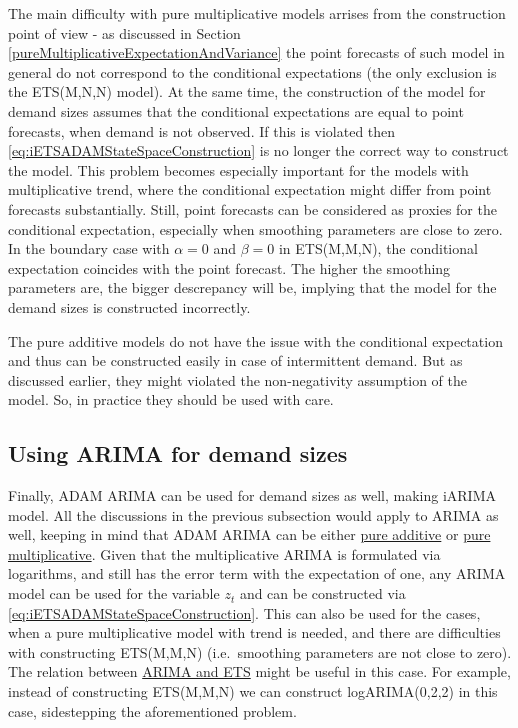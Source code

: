 \documentclass[
]{book}
\theoremstyle{definition}
\theoremstyle{definition}
\theoremstyle{definition}
\theoremstyle{definition}
\theoremstyle{remark}
\begin{document}
The main difficulty with pure multiplicative models arrises from the construction point of view - as discussed in Section \ref{pureMultiplicativeExpectationAndVariance} the point forecasts of such model in general do not correspond to the conditional expectations (the only exclusion is the ETS(M,N,N) model). At the same time, the construction of the model for demand sizes assumes that the conditional expectations are equal to point forecasts, when demand is not observed. If this is violated then \eqref{eq:iETSADAMStateSpaceConstruction} is no longer the correct way to construct the model. This problem becomes especially important for the models with multiplicative trend, where the conditional expectation might differ from point forecasts substantially. Still, point forecasts can be considered as proxies for the conditional expectation, especially when smoothing parameters are close to zero. In the boundary case with \(\alpha=0\) and \(\beta=0\) in ETS(M,M,N), the conditional expectation coincides with the point forecast. The higher the smoothing parameters are, the bigger descrepancy will be, implying that the model for the demand sizes is constructed incorrectly.

The pure additive models do not have the issue with the conditional expectation and thus can be constructed easily in case of intermittent demand. But as discussed earlier, they might violated the non-negativity assumption of the model. So, in practice they should be used with care.

\hypertarget{using-arima-for-demand-sizes}{%
\subsection{Using ARIMA for demand sizes}\label{using-arima-for-demand-sizes}}

Finally, ADAM ARIMA can be used for demand sizes as well, making iARIMA model. All the discussions in the previous subsection would apply to ARIMA as well, keeping in mind that ADAM ARIMA can be either \protect\hyperlink{StateSpaceARIMAAdditive}{pure additive} or \protect\hyperlink{ADAMARIMAPureMultiplicative}{pure multiplicative}. Given that the multiplicative ARIMA is formulated via logarithms, and still has the error term with the expectation of one, any ARIMA model can be used for the variable \(z_t\) and can be constructed via \eqref{eq:iETSADAMStateSpaceConstruction}. This can also be used for the cases, when a pure multiplicative model with trend is needed, and there are difficulties with constructing ETS(M,M,N) (i.e.~smoothing parameters are not close to zero). The relation between \protect\hyperlink{ARIMAandETS}{ARIMA and ETS} might be useful in this case. For example, instead of constructing ETS(M,M,N) we can construct logARIMA(0,2,2) in this case, sidestepping the aforementioned problem.
\end{document}
